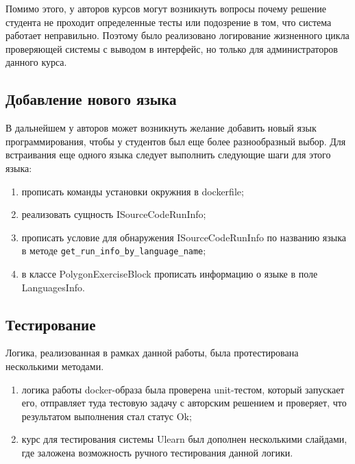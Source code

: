 Помимо этого, у авторов курсов могут возникнуть вопросы почему решение студента не проходит определенные тесты или подозрение в том, что система работает неправильно. Поэтому было реализовано логирование жизненного цикла проверяющей системы с выводом в интерфейс, но только для администраторов данного курса. 

\subsection{Добавление нового языка}
В дальнейшем у авторов может возникнуть желание добавить новый язык программирования, чтобы у студентов был еще более разнообразный выбор. Для встраивания еще одного языка следует выполнить следующие шаги для этого языка: 

\begin{enumerate}
    \item прописать команды установки окружния в dockerfile;
    \item реализовать сущность ISourceCodeRunInfo;
    \item прописать условие для обнаружения ISourceCodeRunInfo по названию языка в методе \texttt{get\_run\_info\_by\_language\_name};
    \item в классе PolygonExerciseBlock прописать информацию о языке в поле LanguagesInfo.
\end{enumerate}

\subsection{Тестирование}

Логика, реализованная в рамках данной работы, была протестирована несколькими методами. 

\begin{enumerate}
    \item логика работы docker-образа была проверена unit-тестом, который запускает его, отправляет туда тестовую задачу с авторским решением и проверяет, что результатом выполнения стал статус Ok;
    \item курс для тестирования системы Ulearn был дополнен несколькими слайдами, где заложена возможность ручного тестирования данной логики.
\end{enumerate}





